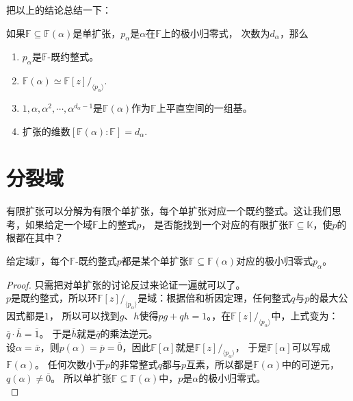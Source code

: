 \documentclass[12pt,UTF8,fontset=none]{ctexbook}
\begin{document}
\begin{appendix}
把以上的结论总结一下：
\begin{pp}\label{pp:9_3}
    如果$\mathbb{F} \subseteq \mathbb{F}(\alpha)$是单扩张，$p_\alpha$是$\alpha$在$\mathbb{F}$上的极小归零式，
    次数为$d_{\alpha}$，那么
    \begin{enumerate}
        \item $p_\alpha$是$\mathbb{F}$-既约整式。
        \item $ \mathbb{F}(\alpha) \simeq \mathbb{F}[z] /_{\langle p_\alpha \rangle}.$
        \item $1, \alpha, \alpha^2, \cdots , \alpha^{d_{\alpha}-1}$是$\mathbb{F}(\alpha)$作为$\mathbb{F}$上平直空间的一组基。
        \item 扩张的维数$[\mathbb{F}(\alpha) : \mathbb{F}] = d_{\alpha}.$
    \end{enumerate}
\end{pp}

\section{分裂域}
有限扩张可以分解为有限个单扩张，每个单扩张对应一个既约整式。这让我们思考，如果给定一个域$\mathbb{F}$上的整式$p$，
是否能找到一个对应的有限扩张$\mathbb{F} \subseteq \mathbb{K}$，使$p$的根都在其中？

\begin{pp}\label{pp:9_4}
    给定域$\mathbb{F}$，每个$\mathbb{F}$-既约整式$p$都是某个单扩张$\mathbb{F} \subseteq \mathbb{F}(\alpha)$对应的极小归零式$p_\alpha$。
\end{pp}
\begin{proof} %
    只需把对单扩张的讨论反过来论证一遍就可以了。\\
    $p$是既约整式，所以环$\mathbb{F}[z] /_{\langle p_\alpha \rangle}$是域：根据倍和析因定理，任何整式$q$与$p$的最大公因式都是$1$，
    所以可以找到$g$、$h$使得$pg + qh = 1$。，在$\mathbb{F}[z] /_{\langle p_\alpha \rangle}$中，上式变为：$\overline{q}\cdot\overline{h} = \overline{1}$。
    于是$\overline{h}$就是$\overline{q}$的乘法逆元。\\
    设$\alpha = \overline{x}$，则$p(\alpha) = \overline{p} = \overline{0}$，因此$\mathbb{F}[\alpha]$就是$\mathbb{F}[z] /_{\langle p_\alpha \rangle}$，
    于是$\mathbb{F}[\alpha]$可以写成$\mathbb{F}(\alpha)$。
    任何次数小于$p$的非常整式$q$都与$p$互素，所以都是$\mathbb{F}(\alpha)$中的可逆元，$q(\alpha) \neq \overline{0}$。
    所以单扩张$\mathbb{F} \subseteq \mathbb{F}(\alpha)$中，$p$是$\alpha$的极小归零式。\\
\end{proof}


\end{appendix}
\end{document}
